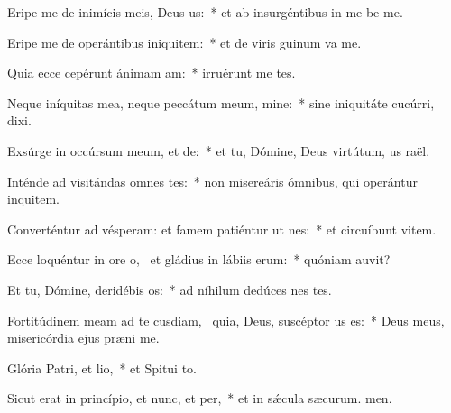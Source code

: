 \item Eripe me de inimícis meis, Deus us:~* et ab insurgéntibus in me be me.
\item Eripe me de operántibus iniquitem:~* et de viris guinum va me.
\item Quia ecce cepérunt ánimam am:~* irruérunt  me tes.
\item Neque iníquitas mea, neque peccátum meum, mine:~* sine iniquitáte cucúrri,  dixi.
\item Exsúrge in occúrsum meum, et de:~* et tu, Dómine, Deus virtútum, us raël.
\item Inténde ad visitándas omnes tes:~* non misereáris ómnibus, qui operántur inquitem.
\item Converténtur ad vésperam: et famem patiéntur ut nes:~* et circuíbunt vitem.
\item Ecce loquéntur in ore o,~\pscross{} et gládius in lábiis erum:~* quóniam  auvit?
\item Et tu, Dómine, deridébis os:~* ad níhilum dedúces nes tes.
\item Fortitúdinem meam ad te cusdiam,~\pscross{} quia, Deus, suscéptor us es:~* Deus meus, misericórdia ejus præni me.
\item Glória Patri, et lio,~* et Spitui to.
\item Sicut erat in princípio, et nunc, et per,~* et in sǽcula sæcurum. men.

